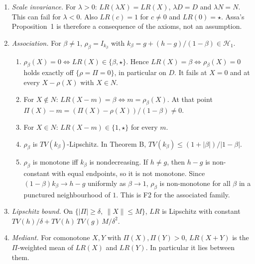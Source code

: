 \begin{corollary}
\begin{enumerate}
\item \emph{Scale invariance.} For $\lambda>0$: $LR(\lambda X)=LR(X)$, $\lambda D=D$ and $\lambda N=N$. This can fail for $\lambda<0$. Also $LR(c)=1$ for $c\ne0$ and $LR(0)=\star$. Assa's Proposition~1 is therefore a consequence of the axioms, not an assumption.
\item \emph{Association.} For $\beta\neq1$, $\rho_\beta=I_{k_\beta}$ with $k_\beta=g+(h-g)/(1-\beta)\in\mathcal H_1$.
  \begin{enumerate}
  \item[(a)] $\rho_\beta(X)=0\iff LR(X)\in\{\beta,\star\}$. Hence $LR(X)=\beta\iff\rho_\beta(X)=0$ holds exactly off $\{\rho=\Pi=0\}$, in particular on $D$. It fails at $X=0$ and at every $X-\rho(X)$ with $X\in N$.
  \item[(b)] For $X\notin N$: $LR(X-m)=\beta\iff m=\rho_\beta(X)$. At that point $\Pi(X)-m=(\Pi(X)-\rho(X))/(1-\beta)\neq0$.
  \item[(c)] For $X\in N$: $LR(X-m)\in\{1,\star\}$ for every $m$.
  \item[(d)] $\rho_\beta$ is $TV(k_\beta)$-Lipschitz. In Theorem B, $TV(k_\beta)\le(1+|\beta|)/|1-\beta|$.
  \item[(e)] $\rho_\beta$ is monotone iff $k_\beta$ is nondecreasing. If $h\ne g$, then $h-g$ is non-constant with equal endpoints, so it is not monotone. Since $(1-\beta)k_\beta\to h-g$ uniformly as $\beta\to1$, $\rho_\beta$ is non-monotone for all $\beta$ in a punctured neighbourhood of $1$. This is F2 for the associated family.
  \end{enumerate}
\item \emph{Lipschitz bound.} On $\{|\Pi|\ge\delta,\ \|X\|\le M\}$, $LR$ is Lipschitz with constant $TV(h)/\delta+TV(h)\,TV(g)\,M/\delta^2$.
\item \emph{Mediant.} For comonotone $X,Y$ with $\Pi(X),\Pi(Y)>0$, $LR(X+Y)$ is the $\Pi$-weighted mean of $LR(X)$ and $LR(Y)$. In particular it lies between them.
\end{enumerate}
\end{corollary}


